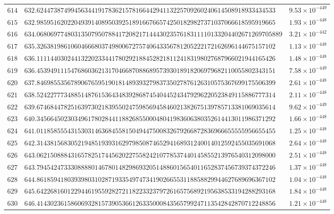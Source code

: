 \documentclass[12pt,reqno]{amsart}
\theoremstyle{remark}
\begin{document}
\begin{longtable}{clc}
$614$ & $632.6244738749945634419178362157816644294113225709260240614508918933434533$ & $9.53\times 10^{-449}$ \\
$615$ & $632.9859516202204939140895039251891667665742501829827371037066618595919665$ & $1.93\times 10^{-448}$ \\
$616$ & $634.068069774803135079507884172082171444302357618311110133204402671269705889$ & $3.21\times 10^{-442}$ \\
$617$ & $635.3263819861060466680374980067275740643356781205222172162696144675157102$ & $1.13\times 10^{-448}$ \\
$618$ & $636.1111440302441322023344178029218845282181124183198027687966021944165426$ & $1.48\times 10^{-448}$ \\
$619$ & $636.4539491115476860362131704668708868957393018918206979682110055802343151$ & $7.58\times 10^{-449}$ \\
$620$ & $637.8469855356789067659519018148939327983735027876126310575367699175506399$ & $2.61\times 10^{-448}$ \\
$621$ & $638.5242277734885148761536434839286874540445243479296220523849115886777314$ & $2.11\times 10^{-448}$ \\
$622$ & $639.6746844782516397302183955024759856945846021382675139785713381069035614$ & $9.62\times 10^{-449}$ \\
$623$ & $640.3456645023034961780284411882685500048041983606380352614413011986371292$ & $1.66\times 10^{-448}$ \\
$624$ & $641.0118585554315303146368455815049447500832679266872836966655555956655455$ & $1.25\times 10^{-448}$ \\
$625$ & $642.3143815683052194851939316297985087465294168931240014012592455035691068$ & $2.64\times 10^{-448}$ \\
$626$ & $643.0621508884316578251744562022755824210778537440145855213976540312098000$ & $2.51\times 10^{-448}$ \\
$627$ & $643.7945424733308888014678014829869320514886015654011652837456739374372246$ & $1.37\times 10^{-448}$ \\
$628$ & $644.8618594180393980310287193354974734190266553118858829944627689696367102$ & $1.04\times 10^{-448}$ \\
$629$ & $645.6422681601229446195592827211822332379726165756892195638533194288293168$ & $1.84\times 10^{-448}$ \\
$630$ & $646.4143023615860693281573905366126335000843565799247113542842870712248856$ & $1.21\times 10^{-448}$ \\

\end{longtable}
\end{document}
